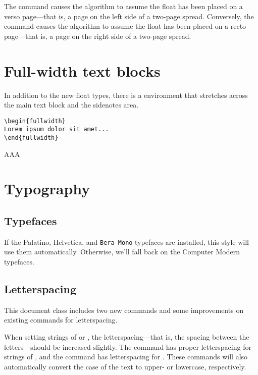 The  command causes the algorithm to assume the
float has been placed on a verso page---that is, a page on the left side of a
two-page spread.  Conversely, the  command causes
the algorithm to assume the float has been placed on a recto page---that is, a
page on the right side of a two-page spread.


\section{Full-width text blocks}

In addition to the new float types, there is a 
environment that stretches across the main text block and the sidenotes
area.

\begin{Verbatim}
\begin{fullwidth}
Lorem ipsum dolor sit amet...
\end{fullwidth}
\end{Verbatim}

\begin{fullwidth}
AAA
\end{fullwidth}

\section{Typography}\label{sec:typography}

\subsection{Typefaces}\label{sec:typefaces}
If the Palatino, \textsf{Helvetica}, and \texttt{Bera Mono} typefaces are installed, this style
will use them automatically.  Otherwise, we'll fall back on the Computer Modern
typefaces.

\subsection{Letterspacing}\label{sec:letterspacing}
This document class includes two new commands and some improvements on
existing commands for letterspacing.

When setting strings of  or , the
letter\-spacing---that is, the spacing between the letters---should be
increased slightly.\cite[][p.32]{Bringhurst2005} The  command has proper letterspacing for
strings of , and the  command
has letterspacing for .  These commands
will also automatically convert the case of the text to upper- or
lowercase, respectively.

